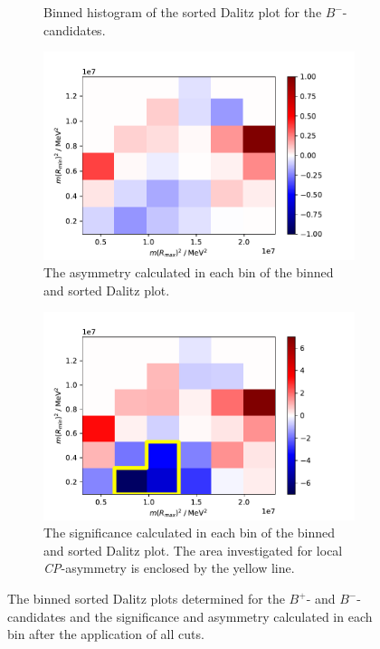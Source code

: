 \begin{figure}[H]
\begin{subfigure}{0.49\textwidth}
    \caption{Binned histogram of the sorted Dalitz plot for the $B^-$-candidates.}
    \label{f7b}
  \end{subfigure}
  \begin{subfigure}{0.49\textwidth}
    \includegraphics[width=\textwidth]{plots/Dalitz_sorted_Asym.pdf}
    \caption{The asymmetry calculated in each bin of the binned and sorted Dalitz plot.}
    \label{f7c}
  \end{subfigure}
  \begin{subfigure}{0.49\textwidth}
    \includegraphics[width=\textwidth]{plots/Dalitz_sorted_bin_cut_sig.pdf}
    \caption{The significance calculated in each bin of the binned and sorted Dalitz plot. 
    The area investigated for local \textit{CP}-asymmetry is enclosed by the yellow line.}
    \label{f7d}
  \end{subfigure}
  \caption{The binned sorted Dalitz plots determined for the $B^+$- and $B^-$-candidates and the significance and asymmetry calculated in each bin after the application 
  of all cuts.}
  \label{f7}
\end{figure}

